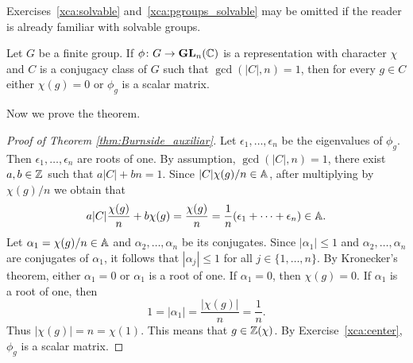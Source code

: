 Exercises~\ref{xca:solvable} and~\ref{xca:pgroups_solvable} may be omitted if the reader is already familiar with solvable groups.

\begin{theorem}[Burnside]
	\label{thm:Burnside_auxiliar}
	Let $G$ be a finite group. If $\phi\colon G\to\mathbf{GL}_n(\mathbb{C})$ is a representation
	with character $\chi$ and $C$ is a conjugacy class of $G$ such that 
	$\gcd(|C|,n)=1$, then for every $g\in C$ either 
	$\chi(g)=0$ or $\phi_g$ is a scalar matrix. 
\end{theorem}




Now we prove the theorem.

\begin{proof}[Proof of Theorem \ref{thm:Burnside_auxiliar}]
	Let $\epsilon_1,\dots,\epsilon_n$ be the eigenvalues of $\phi_g$. Then 
    $\epsilon_1,\dots,\epsilon_n$ are roots of one. 
    By assumption, 
	$\gcd(|C|,n)=1$, there exist $a,b\in\mathbb{Z}$ such that $a|C|+bn=1$. Since 
	$|C|\chi(g)/n\in\mathbb{A}$, after multiplying by $\chi(g)/n$ we obtain that  
	\[
		a|C|\frac{\chi(g)}{n}+b\chi(g)=\frac{\chi(g)}{n}=\frac{1}{n}(\epsilon_1+\cdots+\epsilon_n)\in\mathbb{A}.
	\]
    Let $\alpha_1=\chi(g)/n\in\mathbb{A}$ and $\alpha_2,\dots,\alpha_n$ be its conjugates. Since $|\alpha_1|\leq 1$ 
    and $\alpha_2,\dots,\alpha_n$ are conjugates of $\alpha_1$, it follows that  
    $|\alpha_j|\leq 1$ for all $j\in\{1,\dots,n\}$. By Kronecker's theorem, 
    either $\alpha_1=0$ or $\alpha_1$ is a root of one. If $\alpha_1=0$, then $\chi(g)=0$. If 
    $\alpha_1$ is a root of one, then 
    \[
    1=|\alpha_1|=\frac{|\chi(g)|}{n}=\frac1{n}.
    \]
    Thus $|\chi(g)|=n=\chi(1)$. This means that $g\in\mathbb{Z}(\chi)$. By Exercise~\ref{xca:center}, 
    $\phi_g$ is a scalar matrix. 
\end{proof}


